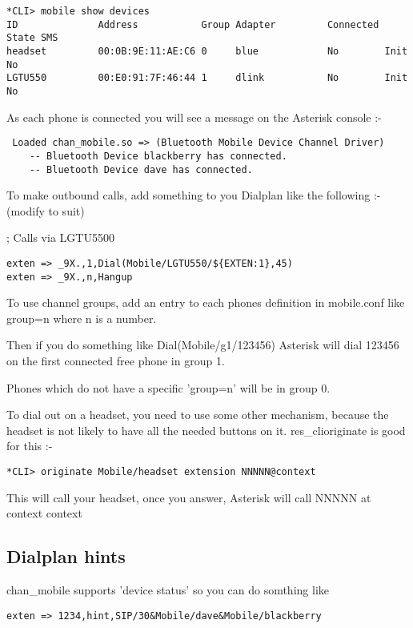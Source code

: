 \begin{verbatim}
*CLI> mobile show devices 
ID              Address           Group Adapter         Connected State SMS
headset         00:0B:9E:11:AE:C6 0     blue            No        Init  No 
LGTU550         00:E0:91:7F:46:44 1     dlink           No        Init  No 
\end{verbatim}

As each phone is connected you will see a message on the Asterisk console :-

\begin{verbatim}
 Loaded chan_mobile.so => (Bluetooth Mobile Device Channel Driver)
    -- Bluetooth Device blackberry has connected.
    -- Bluetooth Device dave has connected.
\end{verbatim}

To make outbound calls, add something to you Dialplan like the following :- (modify to suit)

; Calls via LGTU5500
\begin{verbatim}
exten => _9X.,1,Dial(Mobile/LGTU550/${EXTEN:1},45)
exten => _9X.,n,Hangup
\end{verbatim}

To use channel groups, add an entry to each phones definition in mobile.conf like group=n
where n is a number.

Then if you do something like Dial(Mobile/g1/123456) Asterisk will dial 123456 on the first
connected free phone in group 1.

Phones which do not have a specific 'group=n' will be in group 0.


To dial out on a headset, you need to use some other mechanism, because the headset is not likely
to have all the needed buttons on it. res\_clioriginate is good for this :-

\begin{verbatim}
*CLI> originate Mobile/headset extension NNNNN@context
\end{verbatim}

This will call your headset, once you answer, Asterisk will call NNNNN at context context

\subsection{Dialplan hints}

chan\_mobile supports 'device status' so you can do somthing like

\begin{verbatim}
exten => 1234,hint,SIP/30&Mobile/dave&Mobile/blackberry
\end{verbatim}


